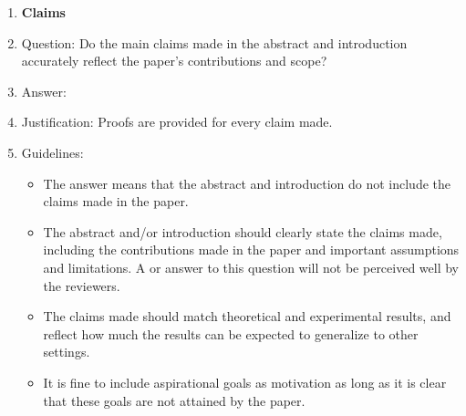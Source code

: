\documentclass{article}
\numberwithin{theorem}{section}
\theoremstyle{definition}
\begin{document}
\begin{enumerate}

\item {\bf Claims}
    \item[] Question: Do the main claims made in the abstract and introduction accurately reflect the paper's contributions and scope?
    \item[] Answer: \answerYes{} %
    \item[] Justification: Proofs are provided for every claim made.
    \item[] Guidelines:
    \begin{itemize}
        \item The answer \answerNA{} means that the abstract and introduction do not include the claims made in the paper.
        \item The abstract and/or introduction should clearly state the claims made, including the contributions made in the paper and important assumptions and limitations. A \answerNo{} or \answerNA{} answer to this question will not be perceived well by the reviewers. 
        \item The claims made should match theoretical and experimental results, and reflect how much the results can be expected to generalize to other settings. 
        \item It is fine to include aspirational goals as motivation as long as it is clear that these goals are not attained by the paper. 
    \end{itemize}


\end{enumerate}
\end{document}
